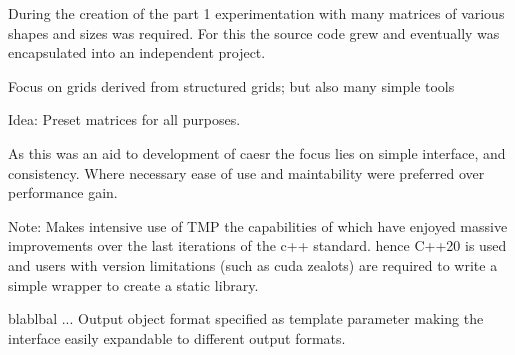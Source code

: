 During the creation of the part 1 experimentation with many matrices of various shapes and sizes was required. For this
the source code grew and eventually was encapsulated into an independent project.

Focus on grids derived from structured grids; but also many simple tools

Idea: Preset matrices for all purposes.

As this was an aid to development of caesr the focus lies on simple interface, and consistency. Where necessary ease of
use and maintability were preferred over performance gain.

Note: Makes intensive use of TMP the capabilities of which have enjoyed massive improvements over the last iterations of
the c++ standard. hence C++20 is used and users with version limitations (such as cuda zealots) are required to write a
simple wrapper to create a static library.

blablbal ... Output object format specified as template parameter making the interface easily expandable to different
output formats.
